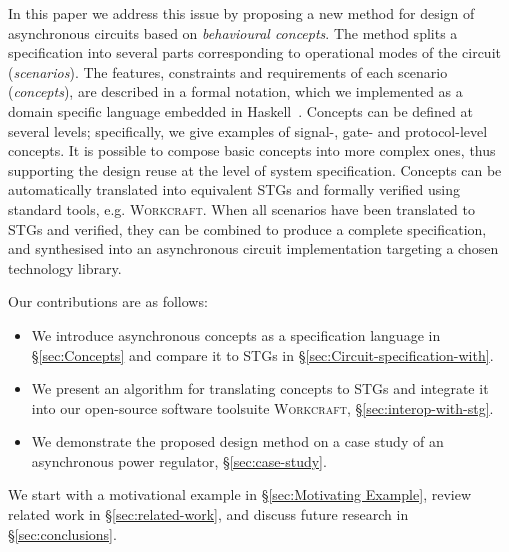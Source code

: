\documentclass[british,compsoc]{IEEEtran}
\newcommand{\noun}[1]{\textsc{#1}}
\begin{document}
In this paper we address this issue by proposing a new method for design
of asynchronous circuits based on \emph{behavioural concepts}.
The method splits a specification into several parts corresponding
to operational modes of the circuit (\emph{scenarios}). The features,
constraints and requirements of each scenario (\emph{concepts}),
are described in a formal notation, which we implemented as a domain
specific language embedded in Haskell~\cite{1996_hudak_dsl}. Concepts can
be defined at several levels; specifically, we give examples of signal-,
gate- and protocol-level concepts. It is possible to compose basic concepts
into more complex ones, thus supporting the design reuse at the level of system
specification.
Concepts can be automatically translated into equivalent STGs and
formally verified using standard tools, e.g. \noun{Workcraft}.
When all scenarios have been translated to STGs and verified, they can be
combined to produce a complete specification, and synthesised into an
asynchronous circuit implementation targeting a chosen technology library.

Our contributions are as follows:
\begin{itemize}
  \item We introduce asynchronous concepts as a specification
  language in \S\ref{sec:Concepts} and compare it to STGs in
  \S\ref{sec:Circuit-specification-with}.
  \item We present an algorithm for translating concepts to STGs
  and integrate it into our open-source software toolsuite \noun{Workcraft},
  \S\ref{sec:interop-with-stg}.
  \item We demonstrate the proposed design method on a case study of an
  asynchronous power regulator, \S\ref{sec:case-study}.
\end{itemize}

\noindent
We start with a motivational example in \S\ref{sec:Motivating Example}, review related work
in \S\ref{sec:related-work}, and discuss future research in \S\ref{sec:conclusions}.
\end{document}
